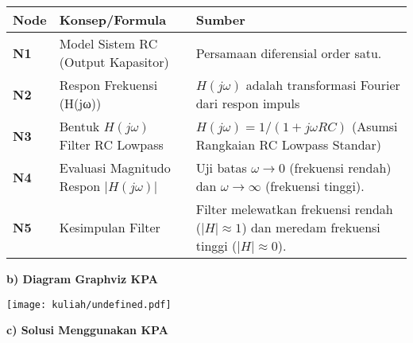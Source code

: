 \documentclass[
  letterpaper,
  DIV=11,
  numbers=noendperiod]{scrreprt}
\begin{document}
\begin{longtable}[]{@{}
  >{\centering\arraybackslash}p{}
  >{\raggedright\arraybackslash}p{}
  >{\raggedright\arraybackslash}p{}@{}}
\toprule\noalign{}
\begin{minipage}[b]{\linewidth}\centering
Node
\end{minipage} & \begin{minipage}[b]{\linewidth}\raggedright
Konsep/Formula
\end{minipage} & \begin{minipage}[b]{\linewidth}\raggedright
Sumber
\end{minipage} \\
\midrule\noalign{}
\endhead
\bottomrule\noalign{}
\endlastfoot
\textbf{N1} & Model Sistem RC (Output Kapasitor) & Persamaan diferensial
order satu. \\
\textbf{N2} & Respon Frekuensi (H(jω)) & \(H(j\omega)\) adalah
transformasi Fourier dari respon impuls \\
\textbf{N3} & Bentuk \(H(j\omega)\) Filter RC Lowpass &
\(H(j\omega) = 1 / (1 + j\omega RC)\) (Asumsi Rangkaian RC Lowpass
Standar) \\
\textbf{N4} & Evaluasi Magnitudo Respon \(|H(j\omega)|\) & Uji batas
\(\omega \rightarrow 0\) (frekuensi rendah) dan
\(\omega \rightarrow \infty\) (frekuensi tinggi). \\
\textbf{N5} & Kesimpulan Filter & Filter melewatkan frekuensi rendah
(\(|H| \approx 1\)) dan meredam frekuensi tinggi (\(|H| \approx 0\)). \\
\end{longtable}

\textbf{b) Diagram Graphviz KPA}

\texttt{[image: kuliah/undefined.pdf]}

\textbf{c) Solusi Menggunakan KPA}
\end{document}
